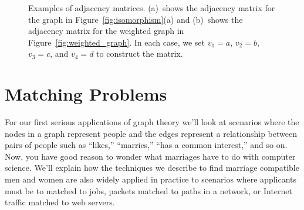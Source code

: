 \begin{figure}\redrawntrue
\normalbaselines
{}
\qquad
{}

\caption{Examples of adjacency matrices.  (a)~shows the adjacency
  matrix for the graph in Figure~\ref{fig:isomorphism}(a) and
  (b)~shows the adjacency matrix for the weighted graph in
  Figure~\ref{fig:weighted_graph}.  In each case, we  set $v_1
  = a$, $v_2 = b$, $v_3 = c$, and $v_4 = d$ to construct the matrix.}
\label{fig:adjacency_matrix}
\end{figure}

\begin{problems}
\classproblems
{}

\homeworkproblems
{}

\examproblems
{}
\end{problems}


\section{Matching Problems}\label{sexam}

For our first serious applications of graph theory we'll look at scenarios
where the nodes in a graph represent people and the edges represent a
relationship between pairs of people such as ``likes,'' ``marries,'' ``has
a common interest,'' and so on.  Now, you have good reason to wonder what
marriages have to do with computer science.  We'll explain how the
techniques we describe to find marriage compatible men and women are
also widely applied in practice to scenarios where applicants must be to
matched to jobs, packets matched to paths in a network, or Internet
traffic matched to web servers.  

